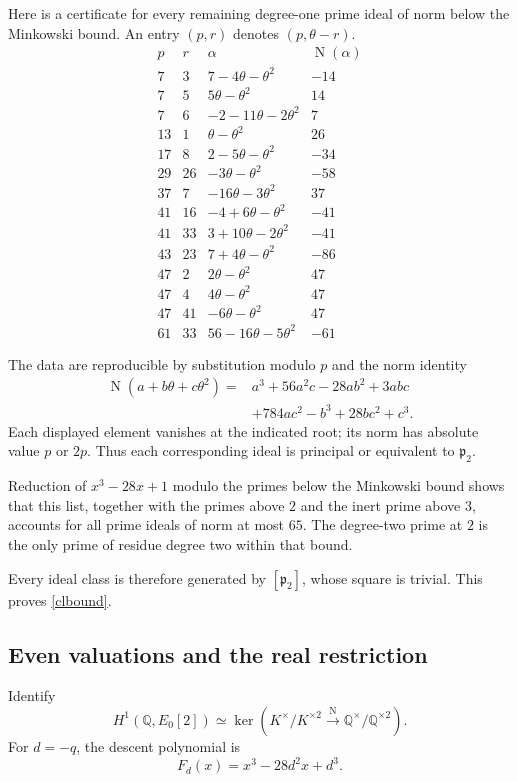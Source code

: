 \documentclass[11pt]{article}
\newcommand{\Q}{\mathbb Q}
\newcommand{\Nm}{\operatorname{N}}
\begin{document}
Here is a certificate for every remaining degree-one
prime ideal of norm below the Minkowski bound. An entry
$(p,r)$ denotes $(p,\theta-r)$.
\[
\begin{array}{rr|l|r}
p&r&\alpha&\Nm(\alpha)\\ \hline
7&3&7-4\theta-\theta^2&-14\\
7&5&5\theta-\theta^2&14\\
7&6&-2-11\theta-2\theta^2&7\\
13&1&\theta-\theta^2&26\\
17&8&2-5\theta-\theta^2&-34\\
29&26&-3\theta-\theta^2&-58\\
37&7&-16\theta-3\theta^2&37\\
41&16&-4+6\theta-\theta^2&-41\\
41&33&3+10\theta-2\theta^2&-41\\
43&23&7+4\theta-\theta^2&-86\\
47&2&2\theta-\theta^2&47\\
47&4&4\theta-\theta^2&47\\
47&41&-6\theta-\theta^2&47\\
61&33&56-16\theta-5\theta^2&-61
\end{array}
\]

The data are reproducible by substitution modulo $p$
and the norm identity
\begin{align*}
\Nm(a+b\theta+c\theta^2)
={}&a^3+56a^2c-28ab^2+3abc\\
&+784ac^2-b^3+28bc^2+c^3.
\end{align*}
Each displayed element vanishes at the indicated root;
its norm has absolute value $p$ or $2p$.
Thus each corresponding ideal is principal or equivalent
to $\mathfrak p_2$.

Reduction of $x^3-28x+1$ modulo the primes below the
Minkowski bound shows that this list, together with the
primes above $2$ and the inert prime above $3$,
accounts for all prime ideals of norm at most $65$.
The degree-two prime at $2$ is the only prime of residue degree two within that bound.

Every ideal class is therefore generated by
$[\mathfrak p_2]$, whose square is trivial.
This proves \eqref{clbound}.

\subsection{Even valuations and the real restriction}

Identify
\[
H^1(\Q,E_0[2])
\simeq
\ker\left(
K^\times/K^{\times2}
\xrightarrow{\Nm}
\Q^\times/\Q^{\times2}
\right).
\]
For $d=-q$, the descent polynomial is
\[
F_d(x)=x^3-28d^2x+d^3.
\]
\end{document}
